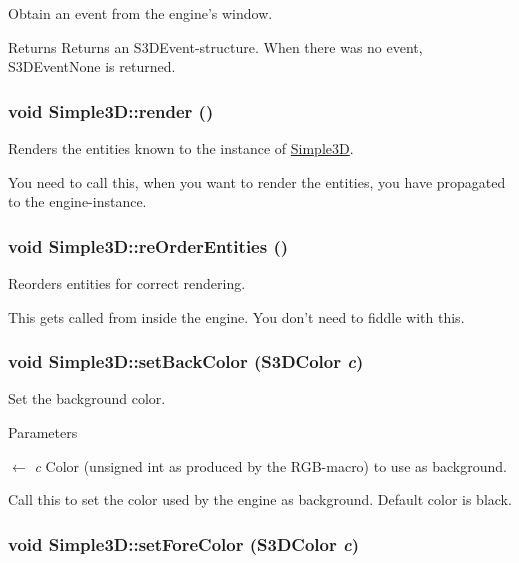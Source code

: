 Obtain an event from the engine's window. 

\begin{DoxyReturn}{Returns}
Returns an S3DEvent-\/structure. When there was no event, S3DEventNone is returned. 
\end{DoxyReturn}
\hypertarget{class_simple3_d_ab98d8b6cfb6abf91b43a035ab36f75f8}{
\subsubsection[{render}]{\setlength{\rightskip}{0pt plus 5cm}void Simple3D::render ()}}
\label{class_simple3_d_ab98d8b6cfb6abf91b43a035ab36f75f8}


Renders the entities known to the instance of \hyperlink{class_simple3_d}{Simple3D}. 

You need to call this, when you want to render the entities, you have propagated to the engine-\/instance. \hypertarget{class_simple3_d_aa0da52599eafb396ec36e3d0cf6da504}{
\subsubsection[{reOrderEntities}]{\setlength{\rightskip}{0pt plus 5cm}void Simple3D::reOrderEntities ()}}
\label{class_simple3_d_aa0da52599eafb396ec36e3d0cf6da504}


Reorders entities for correct rendering. 

This gets called from inside the engine. You don't need to fiddle with this. \hypertarget{class_simple3_d_a2e1f61afda5ab9cb2a1abd05a856c5d7}{
\subsubsection[{setBackColor}]{\setlength{\rightskip}{0pt plus 5cm}void Simple3D::setBackColor ({\bf S3DColor} {\em c})}}
\label{class_simple3_d_a2e1f61afda5ab9cb2a1abd05a856c5d7}


Set the background color. 


\begin{DoxyParams}{Parameters}
\item[\mbox{$\leftarrow$} {\em c}]Color (unsigned int as produced by the RGB-\/macro) to use as background.\end{DoxyParams}
Call this to set the color used by the engine as background. Default color is black. \hypertarget{class_simple3_d_a9dd0eb5a220c4490656dc3dd5cc79857}{
\subsubsection[{setForeColor}]{\setlength{\rightskip}{0pt plus 5cm}void Simple3D::setForeColor ({\bf S3DColor} {\em c})}}
\label{class_simple3_d_a9dd0eb5a220c4490656dc3dd5cc79857}


